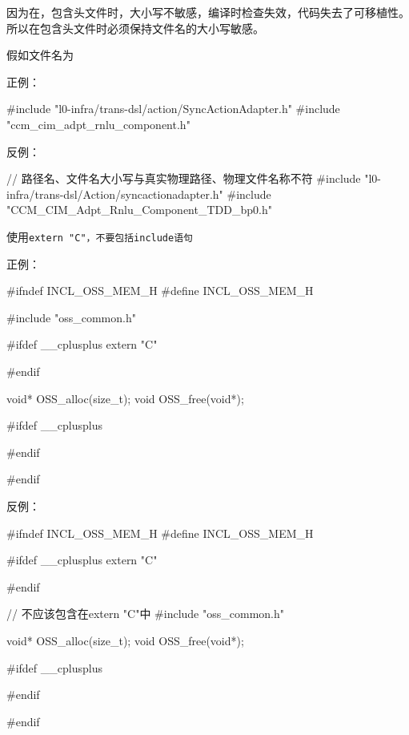 \begin{content}
因为在，包含头文件时，大小写不敏感，编译时检查失效，代码失去了可移植性。所以在包含头文件时必须保持文件名的大小写敏感。

假如文件名为

正例：
\begin{leftbar}
\begin{c++}
#include "l0-infra/trans-dsl/action/SyncActionAdapter.h"
#include "ccm_cim_adpt_rnlu_component.h"
\end{c++}
\end{leftbar}

反例：
\begin{leftbar}
\begin{c++}
// 路径名、文件名大小写与真实物理路径、物理文件名称不符
#include "l0-infra/trans-dsl/Action/syncactionadapter.h"
#include "CCM_CIM_Adpt_Rnlu_Component_TDD_bp0.h"
\end{c++}
\end{leftbar}

\begin{regulation}
使用\tt{extern "C"}，不要包括\tt{include}语句
\end{regulation}

正例：
\begin{leftbar}
\begin{c++}
#ifndef INCL_OSS_MEM_H
#define INCL_OSS_MEM_H

#include "oss_common.h"

#ifdef  __cplusplus
extern "C" {
#endif

void* OSS_alloc(size_t);
void  OSS_free(void*);

#ifdef  __cplusplus
}
#endif

#endif
\end{c++}
\end{leftbar}

反例：
\begin{leftbar}
\begin{c++}
#ifndef INCL_OSS_MEM_H
#define INCL_OSS_MEM_H

#ifdef  __cplusplus
extern "C" {
#endif

// 不应该包含在extern "C"中
#include "oss_common.h"

void* OSS_alloc(size_t);
void  OSS_free(void*);

#ifdef  __cplusplus
}
#endif

#endif
\end{c++}
\end{leftbar}


\end{content}
